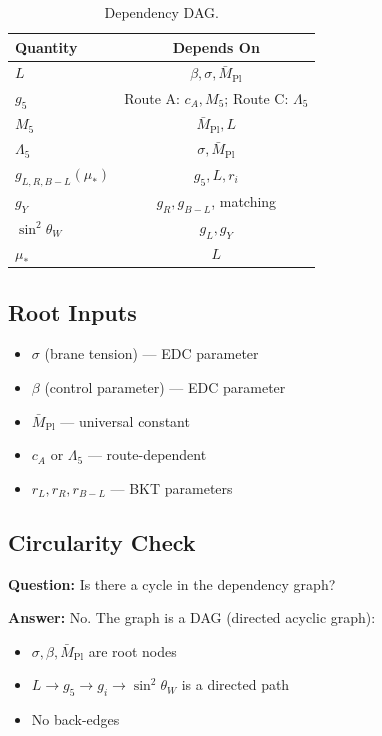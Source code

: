 \documentclass[11pt,a4paper]{article}
\begin{document}
\begin{table}[ht]
\centering
\caption{Dependency DAG.}
\label{tab:dep-dag}
\begin{tabular}{lc}
\toprule
Quantity & Depends On \\
\midrule
$L$ & $\beta, \sigma, \bar{M}_{\text{Pl}}$ \\
$g_5$ & Route A: $c_A, M_5$; Route C: $\Lambda_5$ \\
$M_5$ & $\bar{M}_{\text{Pl}}, L$ \\
$\Lambda_5$ & $\sigma, \bar{M}_{\text{Pl}}$ \\
$g_{L,R,B-L}(\mu_*)$ & $g_5, L, r_i$ \\
$g_Y$ & $g_R, g_{B-L}$, matching \\
$\sin^2\theta_W$ & $g_L, g_Y$ \\
$\mu_*$ & $L$ \\
\bottomrule
\end{tabular}
\end{table}

\subsection{Root Inputs}
\label{subsec:root-inputs}

\begin{itemize}
\item $\sigma$ (brane tension) — EDC parameter
\item $\beta$ (control parameter) — EDC parameter
\item $\bar{M}_{\text{Pl}}$ — universal constant
\item $c_A$ or $\Lambda_5$ — route-dependent
\item $r_L, r_R, r_{B-L}$ — BKT parameters
\end{itemize}

\subsection{Circularity Check}
\label{subsec:circ-check}

\textbf{Question:} Is there a cycle in the dependency graph?

\textbf{Answer:} No. The graph is a DAG (directed acyclic graph):
\begin{itemize}
\item $\sigma, \beta, \bar{M}_{\text{Pl}}$ are root nodes
\item $L \to g_5 \to g_i \to \sin^2\theta_W$ is a directed path
\item No back-edges
\end{itemize}
\end{document}
